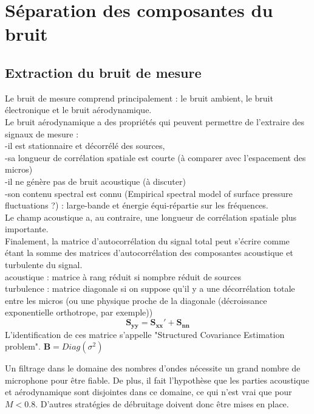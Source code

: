 \chapter{Séparation des composantes du bruit}

\section{Extraction du bruit de mesure}
Le bruit de mesure comprend principalement : le bruit ambient, le bruit électronique et le bruit aérodynamique.\\


Le bruit aérodynamique a des propriétés qui peuvent permettre de l'extraire des signaux de mesure : \\
-il est stationnaire et décorrélé des sources,\\
-sa longueur de corrélation spatiale est courte (à comparer avec l'espacement des micros) \\
-il ne génère pas de bruit acoustique (à discuter)\\
-son contenu spectral est connu (Empirical spectral model of surface pressure fluctuations ?) : large-bande et énergie équi-répartie sur les fréquences.\\

Le champ acoustique a, au contraire, une longueur de corrélation spatiale plus importante.\\

Finalement, la matrice d'autocorrélation du signal total peut s'écrire comme étant la somme des matrices d'autocorrélation des composantes acoustique et turbulente du signal. \\

acoustique : matrice à rang réduit si  nompbre réduit de sources\\
turbulence : matrice diagonale si on suppose qu'il y a une décorrélation totale entre les micros (ou une physique proche de la diagonale (décroissance exponentielle orthotrope, par exemple))\\

\begin{equation}
\bm{S_{yy}} = \bm{S_{xx}}' + \bm{S_{nn}}
\end{equation}
L'identification de ces matrice s'appelle "Structured Covariance Estimation problem".
$\bm{B}=Diag(\sigma^{2})$

Un filtrage dans le domaine des nombres d'ondes nécessite un grand nombre de microphone pour être fiable. De plus, il fait l'hypothèse que les parties acoustique et aérodynamique sont disjointes dans ce domaine, ce qui n'est vrai que pour $M<0.8$. D'autres stratégies de débruitage doivent donc être mises en place.


